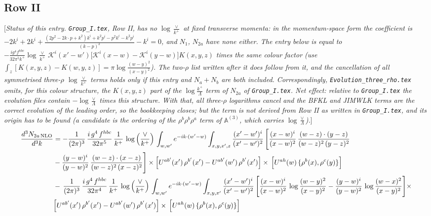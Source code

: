 \documentclass[9pt]{article}
\numberwithin{equation}{section}
\newcommand{\rnote}[1]{{\color{teal}[\textit{#1}]}}
\begin{document}
\subsection{Row II}
\rnote{Status of this entry. \texttt{Group\_I.tex}, Row II, has no $\log\frac{\vee}{k^{+}}$ at fixed transverse momenta: in the momentum-space form the coefficient is $-2k^{i}+2k^{i}+\frac{(2p^{2}-2k\cdot p+k^{2})k^{i}+k^{2}p^{i}-p^{2}k^{i}-k^{2}p^{i}}{(k-p)^{2}}-k^{i}=0$, and $N_{1}$, $N_{2a}$ have none either. The entry below is equal to $-\frac{ig^{4}f^{hbc}}{32\pi^{5}k^{+}}\log\frac{\vee}{k^{+}}\,\mathcal{K}^{i}(x'-w')\big[\mathcal{K}^{i}(x-w)-\mathcal{K}^{i}(y-w)\big]K(x,y,z)$ times the same colour factor (use $\int_{z}[K(x,y,z)-K(w,y,z)]=\pi\log\frac{(w-y)^{2}}{(x-y)^{2}}$). The two-$\rho$ list written after it does follow from it, and the cancellation of all symmetrised three-$\rho$ $\log\frac{\vee}{k^{+}}$ terms holds only if this entry and $N_{a}+N_{b}$ are both included. Correspondingly, \texttt{Evolution\_three\_rho.tex} omits, for this colour structure, the $K(x,y,z)$ part of the $\log\frac{k^{+}}{\Lambda}$ term of $N_{2a}$ of \texttt{Group\_I.tex}. Net effect: relative to \texttt{Group\_I.tex} the evolution files contain $-\log\frac{\vee}{\Lambda}$ times this structure. With that, all three-$\rho$ logarithms cancel and the BFKL and JIMWLK terms are the correct evolution of the leading order, so the bookkeeping closes; but the term is not derived from Row II as written in \texttt{Group\_I.tex}, and its origin has to be found (a candidate is the ordering of the $\rho^{b}\rho^{b}\rho^{a}$ term of $\mathbb{A}^{(3)}$, which carries $\log\frac{\vee}{\Lambda}$).}
\begin{align}
\frac{d^{3}N_{2a\,\rm NLO}}{d^{3}k} & =  -\frac{1}{(2\pi)^{3}}\,\frac{i\,g^{4}\,f^{hbc}}{32\pi^{5}}\,\frac{1}{k^{+}}\,\log{\left(\frac{\vee}{k^{+}}\right)}\,
\int_{w,w'} e^{-ik\cdot(w'-w)}\int_{x,y,x',z}\frac{(x'-w')^{i}}{(x'-w')^{2}}\,\Bigg[\frac{(x-w)^{i}}{(x-w)^{2}}\, \frac{(w-z)\cdot (y-z)}{(w-z)^{2}\,(y-z)^{2}}\notag \\ & - \frac{(y-w)^{i}}{(y-w)^{2}}\, \frac{(w-z)\cdot (x-z)}{(w-z)^{2}\,(x-z)^{2}}\Bigg]\times\Big[U^{ab'}(x')\,\rho^{b'}(x')-U^{ab'}(w')\,\rho^{b'}(x')\Big]\times\, \Big[U^{ah}(w)\,\{\rho^{b}(x),\rho^{c}(y)\}\Big] \notag \\
& -\,\frac{1}{(2\pi)^{3}}\,\frac{i\,g^{4}\,f^{hbc}}{32\pi^{4}}\,\frac{1}{k^{+}}\,\log{\left(\frac{\vee}{k^{+}}\right)}\,
\int_{w,w'} e^{-ik\cdot(w'-w)}\int_{x,y,x'}\frac{(x'-w')^{i}}{(x'-w')^{2}}\,\Bigg[\frac{(x-w)^{i}}{(x-w)^{2}}\,\log\frac{(w-y)^{2}}{(x-y)^{2}}-\frac{(y-w)^{i}}{(y-w)^{2}}\,\log\frac{(w-x)^{2}}{(x-y)^{2}}\Bigg]\times\notag \\ & \Big[U^{ab'}(x')\,\rho^{b'}(x')-U^{ab'}(w')\,\rho^{b'}(x')\Big]\times\, \Big[U^{ah}(w)\,\{\rho^{b}(x),\rho^{c}(y)\}\Big]
\end{align}
\end{document}
